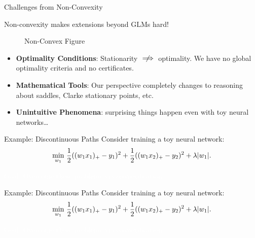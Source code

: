 \documentclass[usenames,dvipsnames,mathserif,notheorems]{beamer}
\newcommand{\bad}[1]{\textcolor{bad}{#1}}
\def\showtikz{}
\begin{document}
\begin{frame}{Challenges from Non-Convexity}
	\begin{center}
		\Large
		Non-convexity makes extensions beyond GLMs \bad{hard}!
	\end{center}

	\begin{figure}[]
		\centering
		\ifdefined\showtikz
			
		\else
			\Huge Non-Convex Figure
		\fi
	\end{figure}

	\pause
	\begin{itemize}
		\item \textbf{Optimality Conditions}: Stationarity \( \centernot \implies \) optimality.
		      We have no global optimality criteria and no certificates.

		      \vspace{1em}

		      \pause
		\item \textbf{Mathematical Tools}: Our perspective completely changes
		      to reasoning about saddles, Clarke stationary points, etc.
		      \vspace{1em}

		      \pause

		\item \textbf{Unintuitive Phenomena}: surprising things happen even
		      with toy neural networks\ldots

	\end{itemize}

\end{frame}

\begin{frame}{Example: Discontinuous Paths}
	Consider training a toy neural network:
	\[
		\min_{w_1} \, \frac 1 2 ((w_1 x_1)_+ - y_1)^2 + \frac 1 2 ((w_1 x_2)_+ - y_2)^2 + \lambda |w_1|.
	\]

	\begin{center}
		
	\end{center}

	\begin{center}
		\Large
		\textcolor{white}{Goal: Overcome these problems via convexification..}
	\end{center}

\end{frame}

\begin{frame}{Example: Discontinuous Paths}
	Consider training a toy neural network:
	\[
		\min_{w_1} \, \frac 1 2 ((w_1 x_1)_+ - y_1)^2 + \frac 1 2 ((w_1 x_2)_+ - y_2)^2 + \lambda |w_1|.
	\]

	\begin{center}
		
	\end{center}

	\begin{center}
		\Large
		\textcolor{white}{Goal: Overcome these problems via convexification..}
	\end{center}


\end{frame}
\end{document}
